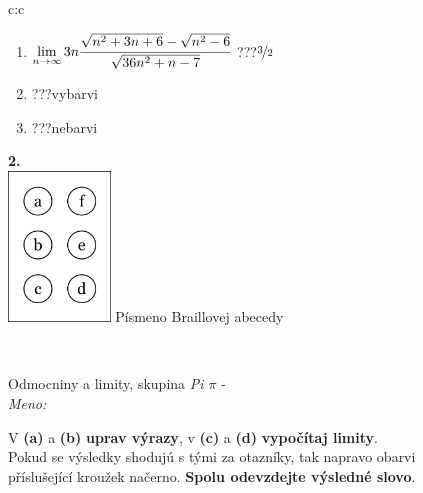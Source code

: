 \documentclass[10pt]{report}
\begin{document}
\begin{tabular}{c:c}
\begin{minipage}[c][104.5mm][t]{0.5\linewidth}
\begin{center}
\begin{minipage}{0.79\linewidth}
\begin{center}
\begin{varwidth}{\linewidth}
\begin{enumerate}
\item $\lim\limits_{n\to\infty}3n\cfrac{\sqrt{n^2+3n+6}-\sqrt{n^2-6}}{\sqrt{36n^2+n-7}}$\quad \dotfill\; ???\;\dotfill \quad $\nicefrac{3}{2}$
\item \quad \dotfill\; ???\;\dotfill \quad vybarvi
\item \quad \dotfill\; ???\;\dotfill \quad nebarvi
\end{enumerate}
\end{varwidth}
\end{center}
\end{minipage}
\begin{minipage}{0.20\linewidth}
\begin{center}
{\Huge\bfseries 2.} \\[2mm]
\includegraphics[height=40mm]{../images/braille.png}
{\small Písmeno Braillovej abecedy}
\end{center}
\end{minipage}
\end{center}
\end{minipage}
\\ \hdashline
\begin{minipage}[c][104.5mm][t]{0.5\linewidth}
\begin{center}
\vspace{7mm}
{\huge Odmocniny a limity, skupina \textit{Pi $\pi$} -}\\[5mm]
\textit{Meno:}\phantom{xxxxxxxxxxxxxxxxxxxxxxxxxxxxxxxxxxxxxxxxxxxxxxxxxxxxxxxxxxxxxxxxx}\\[5mm]
\begin{minipage}{0.95\linewidth}
\begin{center}
V \textbf{(a)} a \textbf{(b)} \textbf{uprav výrazy}, v \textbf{(c)} a \textbf{(d)} \textbf{vypočítaj limity}.\\Pokud se výsledky shodujú s tými za otazníky, tak napravo obarvi\\příslušející kroužek načerno. \textbf{Spolu odevzdejte výsledné slovo}.
\end{center}
\end{minipage}
\\[1mm]

\end{center}
\end{minipage}
\end{tabular}
\end{document}
